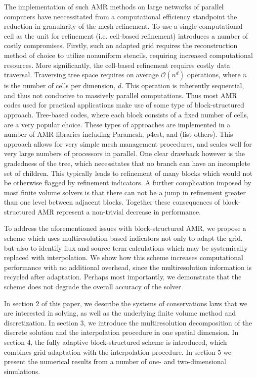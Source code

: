 \documentclass[]{article}
\begin{document}
    The implementation of such AMR methods on large networks of parallel
    computers have neccessitated from a computational efficiency standpoint the
    reduction in granularity of the mesh refinement. To use a single
    computational cell as the unit for refinement (i.e. cell-based refinement)
    introduces a number of costly compromises. Firstly, such an adapted grid
    requires the reconstruction method of choice to utilize nonuniform
    stencils, requiring increased computational resources. More significantly,
    the cell-based refinement requires costly data traversal. Traversing tree
    space requires on average $\mathcal{O}(n^d)$ operations, where $n$ is the
    number of cells per dimension, $d$. This operation is inherently
    sequential, and thus not conducive to massively parallel computations. Thus
    most AMR codes used for practical applications make use of some type of
    block-structured approach.  Tree-based codes, where each block consists of
    a fixed number of cells, are a very popular choice. These types of
    approaches are implemented in a number of AMR libraries including Paramesh,
    p4est, and (list others). This approach allows for very simple mesh
    management procedures, and scales well for very large numbers of processors
    in parallel.  One clear drawback however is the gradedness of the tree,
    which necessitates that no branch can have an incomplete set of children.
    This typically leads to refinement of many blocks which would not be
    otherwise flagged by refinement indicators. A further complication imposed
    by most finite volume solvers is that there can not be a jump in refinement
    greater than one level between adjacent blocks. Together these consequences
    of block-structured AMR represent a non-trivial decrease in performance.

    To address the aforementioned issues with block-structured AMR, we propose
    a scheme which uses multiresolution-based indicators not only to adapt the
    grid, but also to identify flux and source term calculations which may be
    systemically replaced with interpolation.  We show how this scheme
    increases computational performance with no additional overhead, since the
    multiresolution information is recycled after adaptation. Perhaps most
    importantly, we demonstrate that the scheme does not degrade the overall
    accuracy of the solver.

    In section 2 of this paper, we describe the systems of conservations laws
    that we are interested in solving, as well as the underlying finite volume
    method and discretization.  In section 3, we introduce the multiresolution
    decomposition of the discrete solution and the interpolation procedure in
    one spatial dimension. In section 4, the fully adaptive block-structured
    scheme is introduced, which combines grid adaptation with the interpolation
    procedure. In section 5 we present the numerical results from a number of
    one- and two-dimensional simulations.
\end{document}
